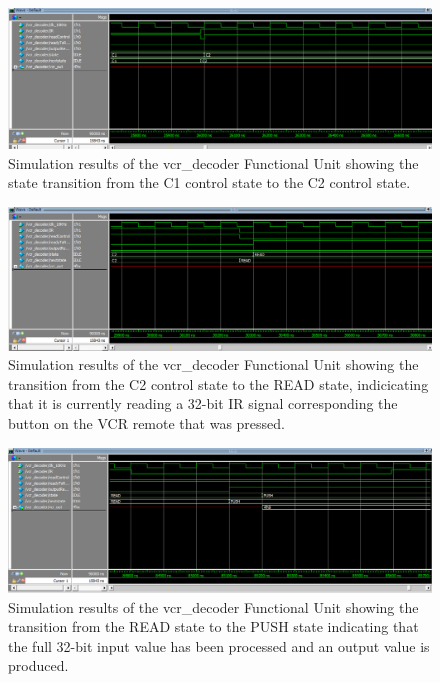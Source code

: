 \documentclass[a4paper]{article}
\begin{document}
\begin{figure}[h]
  \centering
    \includegraphics[width=.98\textwidth]{sims/vcr_testing/moduleTests/vcr_decoder/C1_to_C2_transition.png}
	\caption{Simulation results of the vcr\_decoder Functional Unit showing the state transition from the C1 control state to the C2 control state.}
    \label{fig:top-level-sim}
\end{figure}
\begin{figure}[h]
  \centering
    \includegraphics[width=.98\textwidth]{sims/vcr_testing/moduleTests/vcr_decoder/C2_to_READ_transition.png}
	\caption{Simulation results of the vcr\_decoder Functional Unit showing the transition from the C2 control state to the READ state, indicicating that it is currently reading a 32-bit IR signal corresponding the button on the VCR remote that was pressed.}
    \label{fig:top-level-sim}
\end{figure}
\begin{figure}[h]
  \centering
    \includegraphics[width=.98\textwidth]{sims/vcr_testing/moduleTests/vcr_decoder/READ_to_PUSH_transition.png}
	\caption{Simulation results of the vcr\_decoder Functional Unit showing the transition from the READ state to the PUSH state indicating that the full 32-bit input value has been processed and an output value is produced.}
    \label{fig:top-level-sim}
\end{figure}
\clearpage
\end{document}
